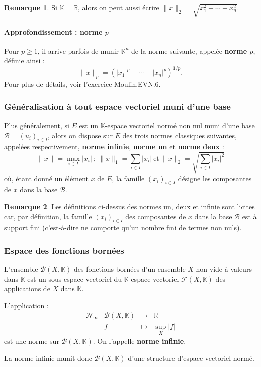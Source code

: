 \documentclass[french]{article}
\newcommand{\R}{\mathbb{R}}
\newcommand{\K}{\mathbb{K}}
\theoremstyle{plain}
\theoremstyle{definition}
\newtheorem*{rmq}{Remarque}
\theoremstyle{remark}
\begin{document}
\begin{rmq}
	Si $\K=\R$, alors on peut aussi écrire $\lVert x\rVert_2=\sqrt{x_1^2+\cdots+x_n^2}$.
\end{rmq}

\paragraph{Approfondissement : norme $p$} Pour $p\geqslant 1$, il arrive parfois de munir $\K^n$ de la norme suivante, appelée \textbf{norme $p$}, définie ainsi : $$\lVert x\rVert_p=(\lvert x_1\rvert^p+\cdots+\lvert x_n\rvert^p)^{1/p}.$$ Pour plus de détails, voir l'exercice Moulin.EVN.6.

\subsubsection*{Généralisation à tout espace vectoriel muni d'une base}
Plus généralement, si $E$ est un $\K$-espace vectoriel normé non nul muni d'une base $\mathcal{B}=(u_i)_{i\in I}$, alors on dispose sur $E$ des trois normes classiques suivantes, appelées respectivement, \textbf{norme infinie}, \textbf{norme un} et \textbf{norme deux} : $$\lVert x\rVert=\underset{i\in I}{\max}\lvert x_i\rvert\ ; \ \lVert x\rVert_1=\sum_{i\in I}\lvert x_i\rvert\ \text{et}\ \lVert x\rVert_2=\sqrt{\sum_{i\in I}\lvert x_i\rvert^2}$$ où, étant donné un élément $x$ de $E$, la famille $(x_i)_{i\in I}$ désigne les composantes de $x$ dans la base $\mathcal{B}$.

\begin{rmq}
	Les définitions ci-dessus des normes un, deux et infinie sont licites car, par définition, la famille $(x_i)_{i\in I}$ des composantes de $x$ dans la base $\mathcal{B}$ est à support fini (c'est-à-dire ne comporte qu'un nombre fini de termes non nuls).
\end{rmq}

\subsubsection*{Espace des fonctions bornées}
L'ensemble $\mathcal{B}(X,\K)$ des fonctions bornées d'un ensemble $X$ non vide à valeurs dans $\K$ est un sous-espace vectoriel du $\K$-espace vectoriel $\mathcal{F}(X,\K)$ des applications de $X$ dans $\K$.

\begin{prop}
	L'application : $$\begin{array}{lrcl}
		\mathcal{N}_\infty&\mathcal{B}(X,\K)&\longrightarrow&\R_+\\
		&f&\longmapsto&\underset{X}{\sup}\lvert f\rvert
	\end{array}$$ est une norme sur $\mathcal{B}(X,\K)$. On l'appelle \textbf{norme infinie}.
\end{prop}
La norme infinie munit donc $\mathcal{B}(X,\K)$ d'une structure d'espace vectoriel normé.
\end{document}

